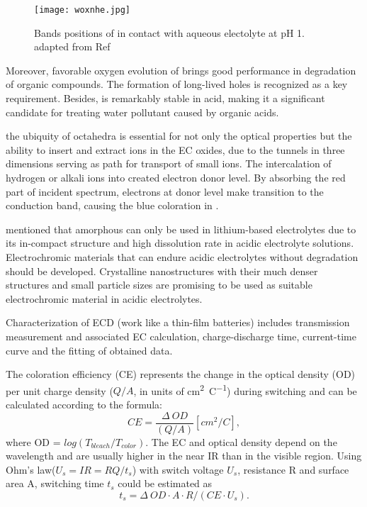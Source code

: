 \begin{figure}[htb]
\centering
\texttt{[image: woxnhe.jpg]}
\caption[Bands positions of  versus NHE]{Bands positions of  in contact with aqueous electolyte at pH 1. adapted from Ref\cite{Gratzel2001}}
\label{fig:woxnhe}
\end{figure}

Moreover, favorable oxygen evolution of  brings good performance in degradation of organic compounds\cite{Hepel2001,Luo2001,Watcharenwong2008}. The formation of long-lived holes is recognized as a key requirement.\cite{Pesci2011} Besides,  is remarkably stable in acid, making it a significant candidate for treating water pollutant caused by organic acids.\cite{Monllor-Satoca2006} 



the ubiquity of  octahedra is essential for not only the optical properties but the ability to insert and extract ions in the EC oxides, due to the tunnels in three dimensions serving as path for transport of small ions.
The intercalation of hydrogen or alkali ions into  created electron donor level. By absorbing the red part of incident spectrum, electrons at donor level make transition to the conduction band, causing the blue coloration in .

\citeauthor{Wang2009a} mentioned that amorphous  can only be used in lithium-based electrolytes due to its
in-compact structure and high dissolution rate in acidic electrolyte solutions. Electrochromic materials that can endure acidic electrolytes without degradation should be developed. Crystalline  nanostructures with their much denser structures and small particle sizes are promising to be used as suitable electrochromic material in acidic electrolytes.

Characterization of ECD (work like a thin-film batteries) includes transmission measurement and associated EC calculation, charge-discharge time, current-time curve and the fitting of obtained data.

The coloration efficiency (CE) represents the change in the optical density (OD) per unit charge density ($Q/A$, in units of \si{\cm^2\per\coulomb}) during switching and can be calculated according to the formula:
\begin{equation}
CE = \frac{\Delta~OD}{(Q/A)} [cm^2/C],
\end{equation}
where OD = $log(T_{bleach}/T_{color})$. The EC and optical density depend on the wavelength and are usually higher in the near IR than in the visible region.
Using Ohm's law($U_s = IR = RQ/t_s$) with switch voltage $U_s$, resistance R and surface area A, switching time $t_s$ could be estimated as
\begin{equation}
t_s = \Delta~OD\cdot A \cdot R /(CE\cdot U_s).
\end{equation}

